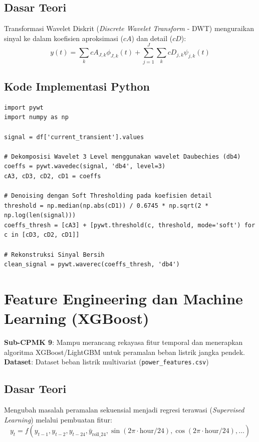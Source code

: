 \documentclass[11pt,a4paper]{report}
\begin{document}
\section{Dasar Teori}
Transformasi Wavelet Diskrit (\textit{Discrete Wavelet Transform} - DWT) menguraikan sinyal ke dalam koefisien aproksimasi ($cA$) dan detail ($cD$):
\begin{equation}
    y(t) = \sum_k cA_{J,k} \phi_{J,k}(t) + \sum_{j=1}^J \sum_k cD_{j,k} \psi_{j,k}(t)
\end{equation}

\section{Kode Implementasi Python}
\begin{lstlisting}
import pywt
import numpy as np

signal = df['current_transient'].values

# Dekomposisi Wavelet 3 Level menggunakan wavelet Daubechies (db4)
coeffs = pywt.wavedec(signal, 'db4', level=3)
cA3, cD3, cD2, cD1 = coeffs

# Denoising dengan Soft Thresholding pada koefisien detail
threshold = np.median(np.abs(cD1)) / 0.6745 * np.sqrt(2 * np.log(len(signal)))
coeffs_thresh = [cA3] + [pywt.threshold(c, threshold, mode='soft') for c in [cD3, cD2, cD1]]

# Rekonstruksi Sinyal Bersih
clean_signal = pywt.waverec(coeffs_thresh, 'db4')
\end{lstlisting}

\newpage

\chapter{Feature Engineering dan Machine Learning (XGBoost)}

\begin{tcolorbox}[title=Informasi Modul 9]
\textbf{Sub-CPMK 9}: Mampu merancang rekayasa fitur temporal dan menerapkan algoritma XGBoost/LightGBM untuk peramalan beban listrik jangka pendek.\\
\textbf{Dataset}: Dataset beban listrik multivariat (\texttt{power\_features.csv})
\end{tcolorbox}

\section{Dasar Teori}
Mengubah masalah peramalan sekuensial menjadi regresi terawasi (\textit{Supervised Learning}) melalui pembuatan fitur:
\begin{equation}
    y_t = f(y_{t-1}, y_{t-2}, y_{t-24}, \bar{y}_{\text{roll\_24}}, \sin(2\pi \cdot \text{hour}/24), \cos(2\pi \cdot \text{hour}/24), \dots)
\end{equation}
\end{document}
